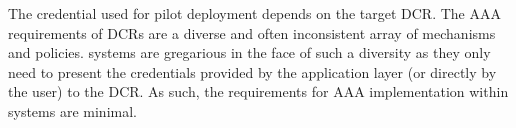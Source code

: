\documentclass{sig-alternate}
\begin{document}
The credential used for pilot deployment depends on the target DCR. The AAA
requirements of DCRs are a diverse and often inconsistent array of mechanisms
and policies. \pilot systems are gregarious in the face of such a diversity as
they only need to present the credentials provided by the application layer (or
directly by the user) to the DCR. As such, the requirements for AAA
implementation within \pilot systems are minimal.



%







\end{document}
